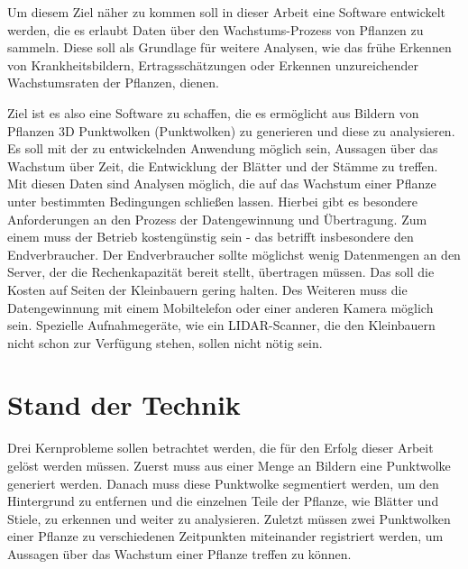 \documentclass[12pt,titlepage, twoside]{article}
\begin{document}
Um diesem Ziel näher zu kommen soll in dieser Arbeit eine Software entwickelt werden, die es erlaubt Daten über den Wachstums-Prozess von Pflanzen zu sammeln. 
Diese soll als Grundlage für weitere Analysen, wie das frühe Erkennen von Krankheitsbildern, Ertragsschätzungen oder Erkennen unzureichender Wachstumsraten der Pflanzen, dienen.

Ziel ist es also eine Software zu schaffen, die es ermöglicht aus Bildern von Pflanzen 3D Punktwolken (Punktwolken) zu generieren und diese zu analysieren.
Es soll mit der zu entwickelnden Anwendung möglich sein, Aussagen über das Wachstum über Zeit, die Entwicklung der Blätter und der Stämme zu treffen. 
Mit diesen Daten sind Analysen möglich, die auf das Wachstum einer Pflanze unter bestimmten Bedingungen schließen lassen.
Hierbei gibt es besondere Anforderungen an den Prozess der Datengewinnung und Übertragung. Zum einem muss der Betrieb kostengünstig sein - das betrifft insbesondere den Endverbraucher.
Der Endverbraucher sollte möglichst wenig Datenmengen an den Server, der die Rechenkapazität bereit stellt, übertragen müssen. 
Das soll die Kosten auf Seiten der Kleinbauern gering halten.
Des Weiteren muss die Datengewinnung mit einem Mobiltelefon oder einer anderen Kamera möglich sein. 
Spezielle Aufnahmegeräte, wie ein LIDAR-Scanner, die den Kleinbauern nicht schon zur Verfügung stehen, sollen nicht nötig sein.

\newpage
\section{Stand der Technik}
\label{sec:stand}
%

Drei Kernprobleme sollen betrachtet werden, die für den Erfolg dieser Arbeit gelöst werden müssen. 
Zuerst muss aus einer Menge an Bildern eine Punktwolke generiert werden. 
Danach muss diese Punktwolke segmentiert werden, um den Hintergrund zu entfernen und die einzelnen Teile der Pflanze, wie Blätter und Stiele, zu erkennen und weiter zu analysieren. 
Zuletzt müssen zwei Punktwolken einer Pflanze zu verschiedenen Zeitpunkten miteinander registriert werden, um Aussagen über das Wachstum einer Pflanze treffen zu können.
\end{document}
